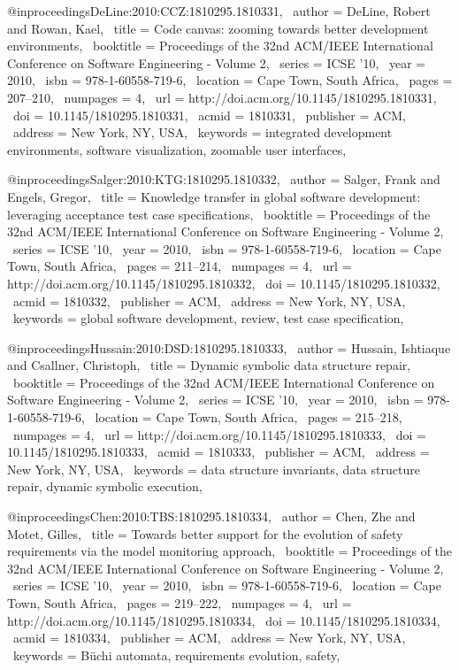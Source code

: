 @inproceedings{DeLine:2010:CCZ:1810295.1810331,
 author = {DeLine, Robert and Rowan, Kael},
 title = {Code canvas: zooming towards better development environments},
 booktitle = {Proceedings of the 32nd ACM/IEEE International Conference on Software Engineering - Volume 2},
 series = {ICSE '10},
 year = {2010},
 isbn = {978-1-60558-719-6},
 location = {Cape Town, South Africa},
 pages = {207--210},
 numpages = {4},
 url = {http://doi.acm.org/10.1145/1810295.1810331},
 doi = {10.1145/1810295.1810331},
 acmid = {1810331},
 publisher = {ACM},
 address = {New York, NY, USA},
 keywords = {integrated development environments, software visualization, zoomable user interfaces},
} 

@inproceedings{Salger:2010:KTG:1810295.1810332,
 author = {Salger, Frank and Engels, Gregor},
 title = {Knowledge transfer in global software development: leveraging acceptance test case specifications},
 booktitle = {Proceedings of the 32nd ACM/IEEE International Conference on Software Engineering - Volume 2},
 series = {ICSE '10},
 year = {2010},
 isbn = {978-1-60558-719-6},
 location = {Cape Town, South Africa},
 pages = {211--214},
 numpages = {4},
 url = {http://doi.acm.org/10.1145/1810295.1810332},
 doi = {10.1145/1810295.1810332},
 acmid = {1810332},
 publisher = {ACM},
 address = {New York, NY, USA},
 keywords = {global software development, review, test case specification},
} 

@inproceedings{Hussain:2010:DSD:1810295.1810333,
 author = {Hussain, Ishtiaque and Csallner, Christoph},
 title = {Dynamic symbolic data structure repair},
 booktitle = {Proceedings of the 32nd ACM/IEEE International Conference on Software Engineering - Volume 2},
 series = {ICSE '10},
 year = {2010},
 isbn = {978-1-60558-719-6},
 location = {Cape Town, South Africa},
 pages = {215--218},
 numpages = {4},
 url = {http://doi.acm.org/10.1145/1810295.1810333},
 doi = {10.1145/1810295.1810333},
 acmid = {1810333},
 publisher = {ACM},
 address = {New York, NY, USA},
 keywords = {data structure invariants, data structure repair, dynamic symbolic execution},
} 

@inproceedings{Chen:2010:TBS:1810295.1810334,
 author = {Chen, Zhe and Motet, Gilles},
 title = {Towards better support for the evolution of safety requirements via the model monitoring approach},
 booktitle = {Proceedings of the 32nd ACM/IEEE International Conference on Software Engineering - Volume 2},
 series = {ICSE '10},
 year = {2010},
 isbn = {978-1-60558-719-6},
 location = {Cape Town, South Africa},
 pages = {219--222},
 numpages = {4},
 url = {http://doi.acm.org/10.1145/1810295.1810334},
 doi = {10.1145/1810295.1810334},
 acmid = {1810334},
 publisher = {ACM},
 address = {New York, NY, USA},
 keywords = {B\"{u}chi automata, requirements evolution, safety},
} 

